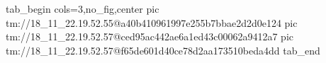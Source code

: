  
 
 
 
 

\qqSecOrig


\ifcmt
  tab_begin cols=3,no_fig,center
    pic tm://18_11_22.19.52.55@a40b410961997e255b7bbae2d2d0e124
    pic tm://18_11_22.19.52.57@ced95ac442ae6a1ed43c00062a9412a7
    pic tm://18_11_22.19.52.57@f65de601d40ce78d2aa173510beda4dd
  tab_end
\fi

